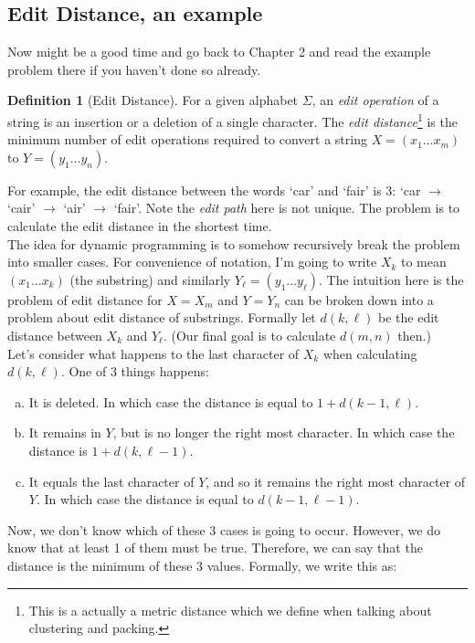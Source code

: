 \documentclass[11pt]{article}
\theoremstyle{plain}
\theoremstyle{definition}
\newtheorem{defn}[thm]{Definition} %
\numberwithin{equation}{section}
\numberwithin{figure}{section}
\begin{document}
\subsection{Edit Distance, an example}
Now might be a good time and go back to Chapter 2 and read the example problem there if you haven't done so already. 

\begin{defn}[Edit Distance]
For a given alphabet $\Sigma$, an \emph{edit operation} of a string is an insertion or a deletion of a single character. The \emph{edit distance}\footnote{This is a actually a metric distance which we define when talking about clustering and packing.} is the minimum number of edit operations required to convert a string $X = (x_1 \ldots x_m)$ to $Y = (y_1 \ldots y_n)$.
\end{defn}

\noindent For example, the edit distance between the words `car' and `fair' is 3: `car $\rightarrow$ `cair' $\rightarrow$ `air' $\rightarrow$ `fair'. Note the \emph{edit path} here is not unique. The problem is to calculate the edit distance in the shortest time. \\

\noindent The idea for dynamic programming is to somehow recursively break the problem into smaller cases. For convenience of notation, I'm going to write $X_k$ to mean $(x_1 \ldots x_k)$ (the substring) and similarly $Y_\ell = (y_1 \ldots y_\ell)$. The intuition here is the problem of edit distance for $X = X_m$ and $Y = Y_n$ can be broken down into a problem about edit distance of substrings. Formally let $d(k,\ell)$ be the edit distance between $X_k$ and $Y_\ell$. (Our final goal is to calculate $d(m,n)$ then.)\\

\noindent Let's consider what happens to the last character of $X_k$ when calculating $d(k,\ell)$. One of 3 things happens:
\begin{enumerate}[(a)]
\item It is deleted. In which case the distance is equal to $1 + d(k-1,\ell)$.
\item It remains in $Y$, but is no longer the right most character. In which case the distance is $1 + d(k, \ell-1)$.
\item It equals the last character of $Y$, and so it remains the right most character of $Y$. In which case the distance is equal to $d(k-1,\ell-1)$.
\end{enumerate}

\noindent Now, we don't know which of these 3 cases is going to occur. However, we do know that at least 1 of them must be true. Therefore, we can say that the distance is the minimum of these 3 values. Formally, we write this as:
\end{document}
